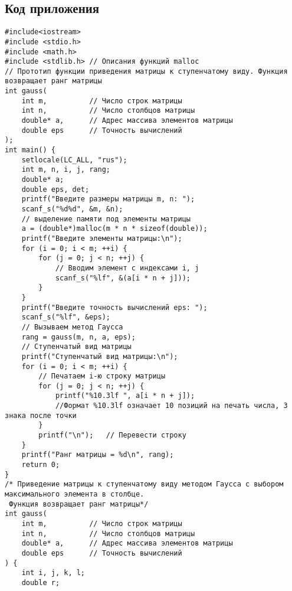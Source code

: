 \documentclass[12pt,a4paper]{scrartcl}
\begin{document}
\subsection{Код приложения} 
\label{sec:exp:code}
\begin{verbatim}
#include<iostream>
#include <stdio.h>  
#include <math.h>   
#include <stdlib.h> // Описания функций malloc 
// Прототип функции приведения матрицы к ступенчатому виду. Функция возвращает ранг матрицы
int gauss(
    int m,          // Число строк матрицы
    int n,          // Число столбцов матрицы
    double* a,      // Адрес массива элементов матрицы
    double eps      // Точность вычислений
);
int main() {
    setlocale(LC_ALL, "rus");
    int m, n, i, j, rang;
    double* a;
    double eps, det;
    printf("Введите размеры матрицы m, n: ");
    scanf_s("%d%d", &m, &n);
    // выделение памяти под элементы матрицы
    a = (double*)malloc(m * n * sizeof(double));
    printf("Введите элементы матрицы:\n");
    for (i = 0; i < m; ++i) {
        for (j = 0; j < n; ++j) {
            // Вводим элемент с индексами i, j
            scanf_s("%lf", &(a[i * n + j]));
        }
    }
    printf("Введите точность вычислений eps: ");
    scanf_s("%lf", &eps);
    // Вызываем метод Гаусса
    rang = gauss(m, n, a, eps);
    // Ступенчатый вид матрицы
    printf("Ступенчатый вид матрицы:\n");
    for (i = 0; i < m; ++i) {
        // Печатаем i-ю строку матрицы
        for (j = 0; j < n; ++j) {
            printf("%10.3lf ", a[i * n + j]);
            //Формат %10.3lf означает 10 позиций на печать числа, 3 знака после точки
        }
        printf("\n");   // Перевести строку
    }
    printf("Ранг матрицы = %d\n", rang);
    return 0;   
}
/* Приведение матрицы к ступенчатому виду методом Гаусса с выбором максимального элемента в столбце.
 Функция возвращает ранг матрицы*/
int gauss(
    int m,          // Число строк матрицы
    int n,          // Число столбцов матрицы
    double* a,      // Адрес массива элементов матрицы
    double eps      // Точность вычислений
) {
    int i, j, k, l;
    double r;


\end{verbatim}
\end{document}
